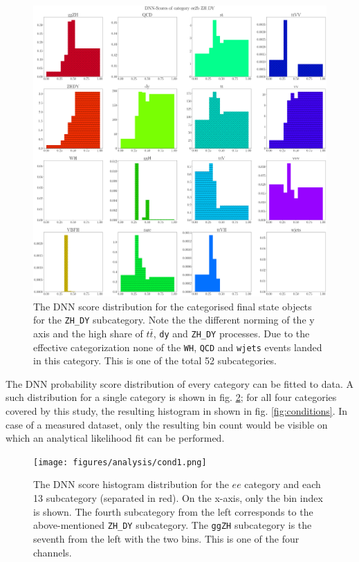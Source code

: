 \begin{figure}[h!]
	\centering
	\includegraphics[width=\linewidth]{figures/analysis/ee_2b_dnn_node_ZH_DY.png}
	\caption{The DNN score distribution for the categorised final state objects for the \texttt{ZH\_DY} subcategory. Note the the different norming of the y axis and the high share of $t\bar{t}$, \texttt{dy} and \texttt{ZH\_DY} processes. Due to the effective categorization none of the \texttt{WH}, \texttt{QCD} and \texttt{wjets} events landed in this category. This is one of the total 52 subcategories.}
	\label{fig:ZH_DY_sub}
\end{figure}

The DNN probability score distribution of every category can be fitted to data. A such distribution for a single category is shown in fig. \ref{fig:ee_dnn_score}; for all four categories covered by this study, the resulting histogram in shown in fig. \ref{fig:conditions}. In case of a measured dataset, only the resulting bin count would be visible on which an analytical likelihood fit can be performed.

\begin{figure}[h!]
	\centering
	\texttt{[image: figures/analysis/cond1.png]}
	\caption{The DNN score histogram distribution for the $ee$ category and each 13 subcategory (separated in red). On the x-axis, only the bin index is shown. The fourth subcategory from the left corresponds to the above-mentioned \texttt{ZH\_DY} subcategory. The \texttt{ggZH} subcategory is the seventh from the left with the two bins. This is one of the four channels.}
	\label{fig:ee_dnn_score}
\end{figure}

